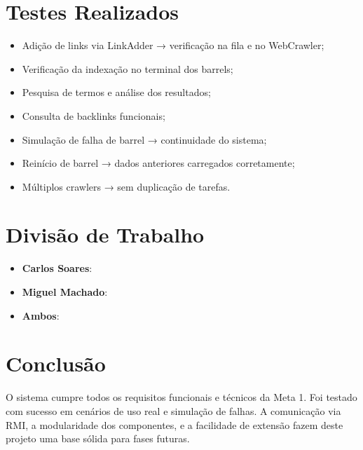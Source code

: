 \documentclass{article}
\begin{document}
\newpage

\section{Testes Realizados}
\begin{itemize}
    \item Adição de links via LinkAdder → verificação na fila e no WebCrawler;
    \item Verificação da indexação no terminal dos barrels;
    \item Pesquisa de termos e análise dos resultados;
    \item Consulta de backlinks funcionais;
    \item Simulação de falha de barrel → continuidade do sistema;
    \item Reinício de barrel → dados anteriores carregados corretamente;
    \item Múltiplos crawlers → sem duplicação de tarefas.
\end{itemize}

\newpage

\section{Divisão de Trabalho}
\begin{itemize}
    \item \textbf{Carlos Soares}: 
    \item \textbf{Miguel Machado}: 
    \item \textbf{Ambos}: 
\end{itemize}

\newpage

\section{Conclusão}
O sistema cumpre todos os requisitos funcionais e técnicos da Meta 1. Foi testado com sucesso em cenários de uso real e simulação de falhas. A comunicação via RMI, a modularidade dos componentes, e a facilidade de extensão fazem deste projeto uma base sólida para fases futuras.
\end{document}
